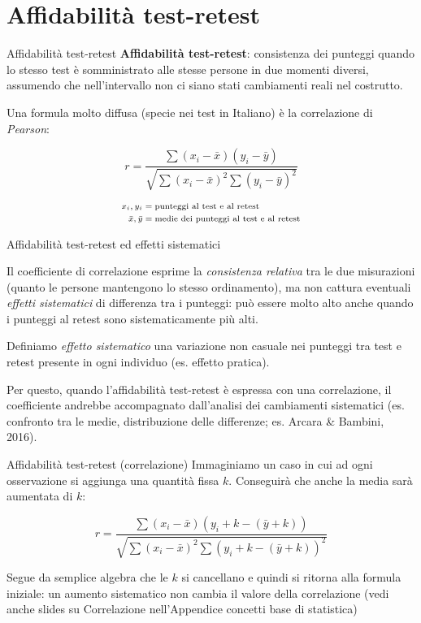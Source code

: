 \documentclass[
  ignorenonframetext,
  aspectratio=169,
]{beamer}
\begin{document}
\section{Affidabilità test-retest}\label{affidabilituxe0-test-retest}

\begin{frame}{Affidabilità test-retest}
\label{affidabilituxe0-test-retest-1}
\textbf{Affidabilità test-retest}: consistenza dei punteggi quando lo
stesso test è somministrato alle stesse persone in due momenti diversi,
assumendo che nell'intervallo non ci siano stati cambiamenti reali nel
costrutto.

Una formula molto diffusa (specie nei test in Italiano) è la
correlazione di \emph{Pearson}:

\[
r = \frac{\sum (x_i - \bar{x})(y_i - \bar{y})}
{\sqrt{\sum (x_i - \bar{x})^2 \sum (y_i - \bar{y})^2}}
\]

\[
\scriptsize
\begin{aligned}
x_i, y_i & = \text{punteggi al test e al retest} \\
\bar{x}, \bar{y} & = \text{medie dei punteggi al test e al retest}
\end{aligned}
\]
\end{frame}

\begin{frame}{Affidabilità test-retest ed effetti sistematici}
\label{affidabilituxe0-test-retest-ed-effetti-sistematici}
\small

Il coefficiente di correlazione esprime la \emph{consistenza relativa}
tra le due misurazioni (quanto le persone mantengono lo stesso
ordinamento), ma non cattura eventuali \emph{effetti sistematici} di
differenza tra i punteggi: può essere molto alto anche quando i punteggi
al retest sono sistematicamente più alti.

Definiamo \emph{effetto sistematico} una variazione non casuale nei
punteggi tra test e retest presente in ogni individuo (es. effetto
pratica).

Per questo, quando l'affidabilità test-retest è espressa con una
correlazione, il coefficiente andrebbe accompagnato dall'analisi dei
cambiamenti sistematici (es. confronto tra le medie, distribuzione delle
differenze; es. Arcara \& Bambini, 2016).
\end{frame}

\begin{frame}{Affidabilità test-retest (correlazione)}
\label{affidabilituxe0-test-retest-correlazione}
Immaginiamo un caso in cui ad ogni osservazione si aggiunga una quantità
fissa \(k\). Conseguirà che anche la media sarà aumentata di \(k\):

\[
r = \frac{\sum (x_i - \bar{x})(y_i + k - (\bar{y} + k))}
{\sqrt{\sum (x_i - \bar{x})^2 \sum (y_i + k - (\bar{y} + k))^2}}
\]

Segue da semplice algebra che le \(k\) si cancellano e quindi si ritorna
alla formula iniziale: un aumento sistematico non cambia il valore della
correlazione (vedi anche slides su Correlazione nell'Appendice concetti
base di statistica)
\end{frame}
\end{document}
